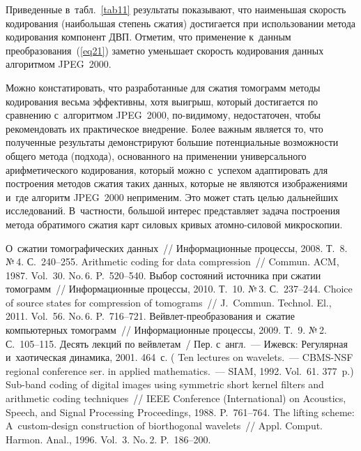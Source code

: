 \begin{multicols}{2}
Приведенные в~табл.~\ref{tab11} результаты показывают, что 
наименьшая скорость кодирования (наибольшая степень сжатия) 
достигается при использовании метода кодирования компонент ДВП. Отметим, 
что применение к~данным преобразования~(\ref{eq21}) заметно уменьшает 
скорость кодирования данных алгоритмом JPEG~2000. 

Можно констатировать, 
что разработанные для сжатия томограмм методы кодирования весьма эффективны, 
хотя выигрыш, который достигается по сравнению с~алгоритмом JPEG~2000, 
по-ви\-ди\-мо\-му, недостаточен, чтобы рекомендовать их практическое внедрение. 
Более важным является то, что полученные результаты демонстрируют большие потенциальные 
возможности общего метода (подхода), основанного на применении универсального 
арифметического кодирования, который можно с~успехом адаптировать для построения 
методов сжатия таких данных, которые не являются изображениями и~где алгоритм JPEG~2000 
неприменим. Это может стать целью дальнейших исследований. В~част\-ности, большой 
интерес представляет задача построения метода обратимого сжатия карт 
силовых кривых атом\-но-си\-ло\-вой микроскопии.



{\small\frenchspacing
 {%
 \begin{thebibliography}{9}
 О~сжатии томографических данных~// 
Информационные процессы, 2008. Т.~8. №\,4. С.~240--255.
 Arithmetic coding for data compression~// 
Commun. ACM, 1987. Vol.~30. No.\,6. P.~520--540.
 Выбор состояний источника при сжатии томограмм~// 
Информационные процессы, 2010. Т.~10. №\,3. С.~237--244.
  Choice of source states for compression of tomograms~// 
J.~Commun. Technol. El., 2011. Vol.~56. No.\,6. P.~716--721.
  Вей\-в\-лет-пре\-об\-ра\-зо\-ва\-ния 
и~сжатие компьютерных томограмм~// Информационные процессы, 2009. Т.~9. №\,2. С.~105--115.
 Десять лекций по вейвлетам~/ Пер. с~англ.~--- 
Ижевск: Регулярная и~хаотическая динамика, 2001. 464~с. 
( Ten lectures on wavelets.~--- CBMS-NSF regional conference 
ser. in applied mathematics.~--- SIAM, 1992. Vol.~61. 377~p.)
  Sub-band coding of digital images using symmetric short 
kernel filters and arithmetic coding techniques~// IEEE  Conference  (International) on
Acoustics,  Speech, and Signal Processing Proceedings, 1988. P.~761--764.
 The lifting scheme: A~custom-design construction 
of biorthogonal wavelets~//  Appl. Comput. Harmon. Anal., 1996.  
Vol.~3. No.\,2. P.~186--200.
 \end{thebibliography}

 }
 }

\end{multicols}

